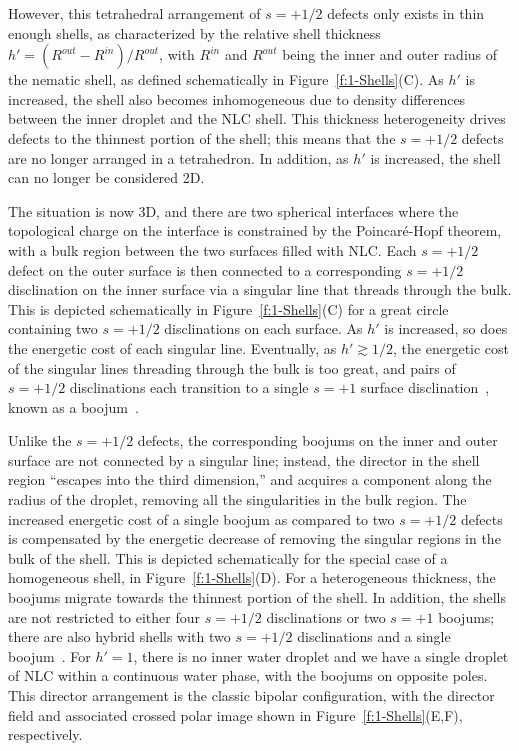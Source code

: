 However, this tetrahedral arrangement of $s = +1/2$ defects only exists in thin enough shells, as characterized by the relative shell thickness $h' = (R^{out}-R^{in})/R^{out}$, with $R^{in}$ and $R^{out}$ being the inner and outer radius of the nematic shell, as defined schematically in Figure~\ref{f:1-Shells}(C).
As $h'$ is increased, the shell also becomes inhomogeneous due to density differences between the inner droplet and the NLC shell.
This thickness heterogeneity drives defects to the thinnest portion of the shell; this means that the $s = +1/2$ defects are no longer arranged in a tetrahedron.
In addition, as $h'$ is increased, the shell can no longer be considered 2D.

The situation is now 3D, and there are two spherical interfaces where the topological charge on the interface is constrained by the Poincar\'e-Hopf theorem, with a bulk region between the two surfaces filled with NLC.
Each $s = +1/2$ defect on the outer surface is then connected to a corresponding $s = +1/2$ disclination on the inner surface via a singular line that threads through the bulk.
This is depicted schematically in Figure~\ref{f:1-Shells}(C) for a great circle containing two $s = +1/2$ disclinations on each surface.
As $h'$ is increased, so does the energetic cost of each singular line.
Eventually, as $h'\gtrsim 1/2$, the energetic cost of the singular lines threading through the bulk is too great, and pairs of $s = +1/2$ disclinations each transition to a single $s = +1$ surface disclination~\cite{RN105}, known as a boojum~\cite{RN273}.

Unlike the $s = +1/2$ defects, the corresponding boojums on the inner and outer surface are not connected by a singular line; instead, the director in the shell region ``escapes into the third dimension,'' and acquires a component along the radius of the droplet, removing all the singularities in the bulk region.
The increased energetic cost of a single boojum as compared to two $s = +1/2$ defects is compensated by the energetic decrease of removing the singular regions in the bulk of the shell.
This is depicted schematically for the special case of a homogeneous shell, in Figure~\ref{f:1-Shells}(D).
For a heterogeneous thickness, the boojums migrate towards the thinnest portion of the shell.
In addition, the shells are not restricted to either four $s = +1/2$ disclinations or two $s = +1$ boojums; there are also hybrid shells with two $s = +1/2$ disclinations and a single boojum~\cite{RN105}.
For $h' = 1$, there is no inner water droplet and we have a single droplet of NLC within a continuous water phase, with the boojums on opposite poles.
This director arrangement is the classic bipolar configuration, with the director field and associated crossed polar image shown in Figure~\ref{f:1-Shells}(E,F), respectively.

